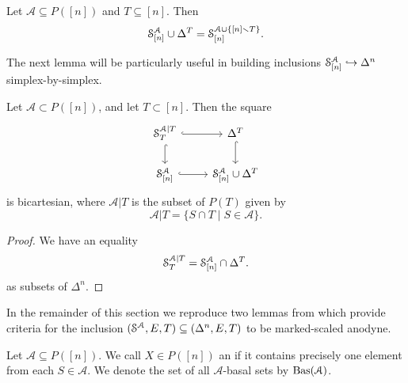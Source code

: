 \documentclass[main.tex]{subfiles}
\begin{document}
\begin{lemma}
  \label{lemma:add_a_simplex}
  Let $\mathcal{A} \subseteq P([n])$ and $T \subseteq [n]$. Then
  \begin{equation*}
    \S^{\mathcal{A}}_{[n]} \cup \Delta^{T} = \S^{\mathcal{A} \cup \{[n] \smallsetminus T\}}_{[n]}.
  \end{equation*}
\end{lemma}

The next lemma will be particularly useful in building inclusions $\S^{\mathcal{A}}_{[n]} \hookrightarrow \Delta^{n}$ simplex-by-simplex.

\begin{lemma}
  \label{lemma:bicartesian_square}
  Let $\mathcal{A} \subset P([n])$, and let $T \subset [n]$. Then the square
  \begin{equation*}
    \begin{tikzcd}
      \S^{\mathcal{A}|T}_{T}
      \arrow[r, hook]
      \arrow[d, hook]
      & \Delta^{T}
      \arrow[d, hook]
      \\
      \S^{\mathcal{A}}_{[n]}
      \arrow[r, hook]
      & \S^{\mathcal{A}}_{[n]} \cup \Delta^{T}
    \end{tikzcd}
  \end{equation*}
  is bicartesian, where $\mathcal{A}|T$ is the subset of $P(T)$ given by
  \begin{equation*}
    \mathcal{A}|T = \{S \cap T \mid S \in \mathcal{A}\}.
  \end{equation*}
\end{lemma}
\begin{proof}
  We have an equality
  \begin{equation*}
    \mathcal{S}_{T}^{\mathcal{A}|T} = \S^{\mathcal{A}}_{[n]} \cap \Delta^{T}.
  \end{equation*}
  as subsets of $\Delta^{n}$.
\end{proof}


In the remainder of this section we reproduce two lemmas from \cite{garcia2cartesianfibrationsii} which provide criteria for the inclusion $(\S^{\mathcal{A}}, E, T) \subseteq (\Delta^{n}, E, T)$ to be marked-scaled anodyne.

\begin{definition}
  Let $\mathcal{A} \subseteq P([n])$. We call $X \in P([n])$ an  if it contains precisely one element from each $S \in \mathcal{A}$. We denote the set of all $\mathcal{A}$-basal sets by $\Bas(\mathcal{A})$.
\end{definition}
\end{document}
